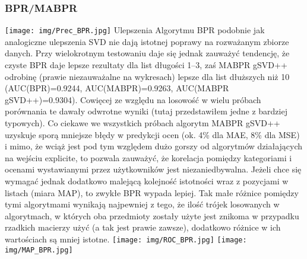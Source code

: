 \documentclass{pracamgr}
\begin{document}
    \subsubsection{BPR/MABPR}
     \texttt{[image: img/Prec\_BPR.jpg]}\newline
     Ulepszenia Algorytmu BPR podobnie jak analogiczne ulepszenia SVD nie dają istotnej poprawy na rozważanym zbiorze danych.
     Przy wielokrotnym testowaniu daje się jednak zauważyć tendencję, że czyste BPR daje lepsze rezultaty dla list długości 1--3,
     zaś MABPR gSVD++ odrobinę (prawie niezauważalne na wykresach) lepsze dla list dłuższych niż 10 (AUC(BPR)=0.9244, AUC(MABPR)=0.9263, AUC(MABPR gSVD++)=0.9304).
     Cowięcej ze względu na losowość w wielu próbach porównania te dawały odwrotne wyniki (tutaj przedstawiłem jedne z bardziej typowych).
     Co ciekawe we wszystkich próbach algorytm MABPR gSVD++ uzyskuje sporą mniejsze błędy w predykcji ocen (ok. 4\% dla MAE, 8\% dla MSE) i mimo,
     że wciąż jest pod tym względem dużo gorszy od algorytmów działających na wejściu explicite, to pozwala zauważyć,
     że korelacja pomiędzy kategoriami i ocenami wystawianymi przez użytkowników jest niezaniedbywalna.
     Jeżeli chce się wymagać jednak dodatkowo malejącą kolejność istotności wraz z pozycjami w listach (miara MAP), to zwykłe BPR wypada lepiej.
     Tak małe różnice pomiędzy tymi algorytmami wynikają najpewniej z tego, że ilość trójek losowanych w algorytmach, w których oba przedmioty
     zostały użyte jest znikoma w przypadku rzadkich macierzy użyć (a tak jest prawie zawsze), dodatkowo różnice w ich wartościach są mniej istotne.\newline
     \texttt{[image: img/ROC\_BPR.jpg]}
      \texttt{[image: img/MAP\_BPR.jpg]}    
\end{document}
